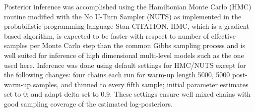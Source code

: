 \documentclass[12pt,letterpaper]{article}
\begin{document}

Posterior inference was accomplished using the Hamiltonian Monte Carlo (HMC) routine modified with the No U-Turn Sampler (NUTS) as implemented in the probabilistic programming language Stan CITATION. HMC, which is a gradient based algorithm, is expected to be faster with respect to number of effective samples per Monte Carlo step than the common Gibbs sampling process and is well suited for inference of high dimensional multi-level models such as the one used here. Inference was done using default settings for HMC/NUTS except for the following changes: four chains each run for warm-up length 5000, 5000 post-warm-up samples, and thinned to every fifth sample; initial parameter estimates set to 0; and adapt delta set to 0.9. These settings ensure well mixed chains with good sampling coverage of the estimated log-posteriors.
\end{document}
